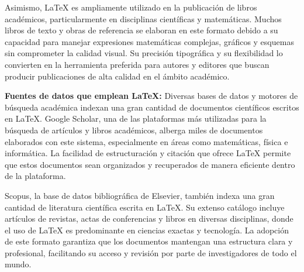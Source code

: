 \documentclass[10pt,twocolumn]{article}
\begin{document}
Asimismo, LaTeX es ampliamente utilizado en la publicación de libros académicos, particularmente en disciplinas científicas y matemáticas. 
Muchos libros de texto y obras de referencia se elaboran en este formato debido a su capacidad para manejar expresiones matemáticas complejas, gráficos y esquemas sin comprometer la calidad visual. 
Su precisión tipográfica y su flexibilidad lo convierten en la herramienta preferida para autores y editores que buscan producir publicaciones de alta calidad en el ámbito académico.

{\raggedleft \textbf{Fuentes de datos que emplean LaTeX:}}
Diversas bases de datos y motores de búsqueda académica indexan una gran cantidad de documentos científicos escritos en LaTeX. 
Google Scholar, una de las plataformas más utilizadas para la búsqueda de artículos y libros académicos, alberga miles de documentos elaborados con este sistema, especialmente en áreas como matemáticas, física e informática. 
La facilidad de estructuración y citación que ofrece LaTeX permite que estos documentos sean organizados y recuperados de manera eficiente dentro de la plataforma.

Scopus, la base de datos bibliográfica de Elsevier, también indexa una gran cantidad de literatura científica escrita en LaTeX. 
Su extenso catálogo incluye artículos de revistas, actas de conferencias y libros en diversas disciplinas, donde el uso de LaTeX es predominante en ciencias exactas y tecnología. 
La adopción de este formato garantiza que los documentos mantengan una estructura clara y profesional, facilitando su acceso y revisión por parte de investigadores de todo el mundo.
\end{document}
